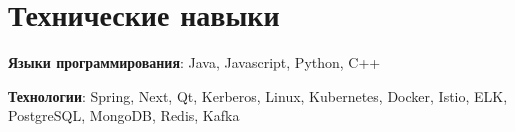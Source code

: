 

\section{Технические навыки}\label{sec:programming-skills}
\resumeSubHeadingListStart
\item{
    \textbf{Языки программирования}{: Java, Javascript, Python, C++}
}
\item{
    \textbf{Технологии}{: Spring, Next, Qt, Kerberos, Linux, Kubernetes, Docker, Istio, ELK, PostgreSQL, MongoDB, Redis, Kafka}
}
\resumeSubHeadingListEnd
